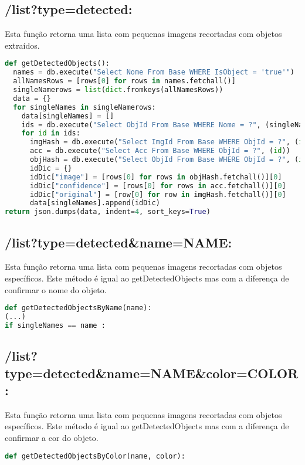 \documentclass{report}
\begin{document}
\subsection{/list?type=detected:}
Esta função retorna uma lista com pequenas imagens recortadas com objetos extraídos.

\begin{lstlisting}[language=Python, caption={getDetectedObjects}] 
def getDetectedObjects():
  names = db.execute("Select Nome From Base WHERE IsObject = 'true'")
  allNamesRows = [rows[0] for rows in names.fetchall()]
  singleNamerows = list(dict.fromkeys(allNamesRows))
  data = {}
  for singleNames in singleNamerows: 
    data[singleNames] = [] 
    ids = db.execute("Select ObjId From Base WHERE Nome = ?", (singleNames,)) 
    for id in ids:
      imgHash = db.execute("Select ImgId From Base WHERE ObjId = ?", (id)) 
      acc = db.execute("Select Acc From Base WHERE ObjId = ?", (id))
      objHash = db.execute("Select ObjId From Base WHERE ObjId = ?", (id)) 
      idDic = {} 
      idDic["image"] = [rows[0] for rows in objHash.fetchall()][0] 
      idDic["confidence"] = [rows[0] for rows in acc.fetchall()][0]
      idDic["original"] = [row[0] for row in imgHash.fetchall()][0] 
      data[singleNames].append(idDic)
return json.dumps(data, indent=4, sort_keys=True)
\end{lstlisting}


\subsection{/list?type=detected\&name=NAME:}
Esta função retorna uma lista com pequenas imagens recortadas com objetos específicos. Este método é igual ao getDetectedObjects mas com a diferença de confirmar o nome do objeto.
\begin{lstlisting}[language=Python, caption={getDetectedObjectsByName}] 
def getDetectedObjectsByName(name):
(...)
if singleNames == name :
\end{lstlisting}

\subsection{/list?type=detected\&name=NAME\&color=COLOR:}
Esta função retorna uma lista com pequenas imagens recortadas com objetos específicos. Este método é igual ao getDetectedObjects mas com a diferença de confirmar a cor do objeto.

\begin{lstlisting}[language=Python, caption={getDetectedObjectsByColor}] 
def getDetectedObjectsByColor(name, color):
\end{lstlisting}
\end{document}
